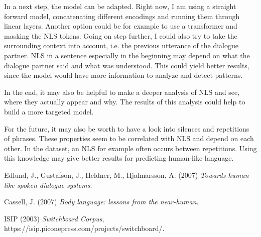 \documentclass[
	11pt, %
]{fphw}
\begin{document}
In a next step, the model can be adapted. Right now, I am using a straight forward model, concatenating different encodings and running them through linear layers. Another option could be for example to use a transformer and masking the NLS tokens. Going on step further, I could also try to take the surrounding context into account, i.e. the previous utterance of the dialogue partner. NLS in a sentence especially in the beginning may depend on what the dialogue partner said and what was understood. This could yield better results, since the model would have more information to analyze and detect patterns. 

In the end, it may also be helpful to make a deeper analysis of NLS and see, where they actually appear and why. The results of this analysis could help to build a more targeted model.

For the future, it may also be worth to have a look into silences and repetitions of phrases. These properties seem to be correlated with NLS and depend on each other. In the dataset, an NLS for example often occurs between repetitions. Using this knowledge may give better results for predicting human-like language.

\begin{thebibliography}{9}
    Edlund, J., Gustafson, J., Heldner, M., Hjalmarsson, A. (2007) \emph{Towards
human-like spoken dialogue systems}.
    
    Cassell, J. (2007) \emph{Body language: lessons from the near-human}.

    ISIP (2003) \emph{Switchboard Corpus}, https://isip.piconepress.com/projects/switchboard/.
    \end{thebibliography}
\end{document}
